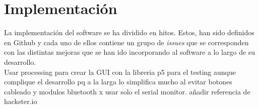 \chapter{Implementación}

La implementación del software se ha dividido en hitos. Estos, han sido definidos en Github
y cada uno de ellos contiene un grupo de \textit{issues} que se corresponden con las distintas
mejoras que se han ido incorporando al software a lo largo de su desarrollo.\\

Usar processing para crear la GUI con la libreria p5 para el testing aunque complique el desarrollo pq a la larga lo simplifica mucho al evitar botones cableado y modulos bluetooth x usar solo el serial monitor.
añadir referencia de hackster.io 